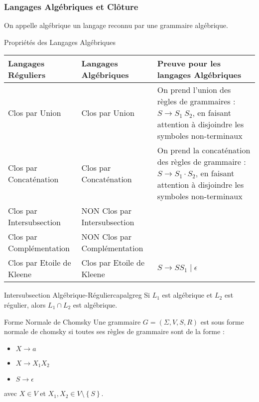 \documentclass{cours}
\begin{document}
\subsubsection{Langages Algébriques et Clôture}
On appelle algébrique un langage reconnu par une grammaire algébrique.
\begin{propositionfr}{Propriétés des Langages Algébriques}{}
    \begin{center}
        \begin{tabular}{p{3.5cm}p{3.5cm}p{5cm}}
            \toprule
            Langages Réguliers & Langages Algébriques & Preuve pour les langages Algébriques\\
            \midrule
            Clos par Union & Clos par Union & On prend l'union des règles de grammaires : $S \rightarrow S_{1}\ S_{2}$, en faisant attention à disjoindre les symboles non-terminaux\\
            Clos par Concaténation & Clos par Concaténation & On prend la concaténation des règles de grammaire : $S \rightarrow S_{1} \cdot S_{2}$, en faisant attention à disjoindre les symboles non-terminaux\\
            Clos par Intersubsection & NON Clos par Intersubsection & \\
            Clos par Complémentation & NON Clos par Complémentation &\\
            Clos par Etoile de Kleene & Clos par Etoile de Kleene & $S \rightarrow S S_{1} \mid \epsilon$\\
            \bottomrule         
        \end{tabular}
    \end{center}
\end{propositionfr}

\begin{théorème}{Intersubsection Algébrique-Régulier}{capalgreg}
    Si $L_{1}$ est algébrique et $L_{2}$ est régulier, alors $L_{1} \cap L_{2}$ est algébrique.
\end{théorème}

\begin{définition}{Forme Normale de Chomsky}{}
    Une grammaire $G = \left(\Sigma, V, S, R\right)$ est sous forme normale de chomsky si toutes ses règles de grammaire sont de la forme : 
    \begin{itemize}
        \item $X \rightarrow a$
        \item $X \rightarrow X_{1}X_{2}$
        \item $S \rightarrow \epsilon$
    \end{itemize}
    avec $X \in V$ et $X_{1}, X_{2} \in V \setminus \left\{S\right\}$.
\end{définition}
\end{document}
